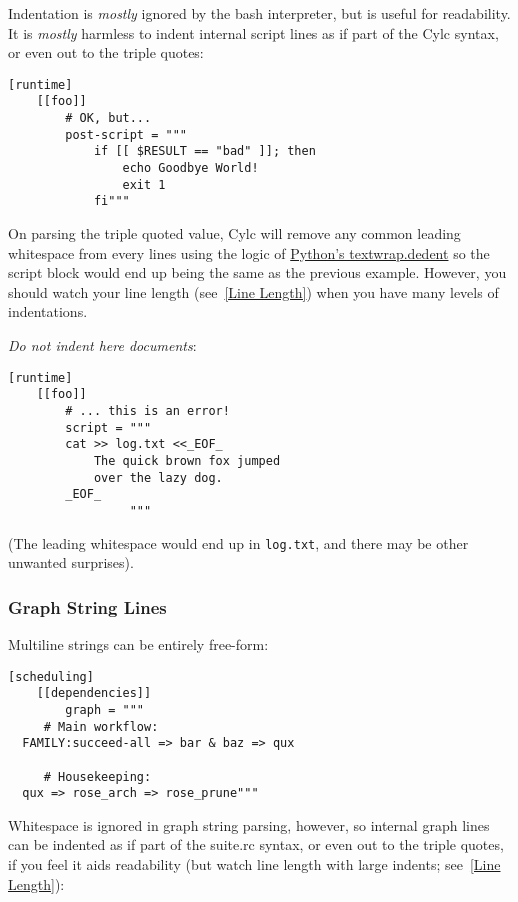 Indentation is {\em mostly} ignored by the bash interpreter, but is useful for
readability. It is {\em mostly} harmless to indent internal script lines as if
part of the Cylc syntax, or even out to the triple quotes:

\lstset{language=suiterc}
\begin{lstlisting}
[runtime]
    [[foo]]
        # OK, but...
        post-script = """
            if [[ $RESULT == "bad" ]]; then
                echo Goodbye World!
                exit 1
            fi"""
\end{lstlisting}

On parsing the triple quoted value, Cylc will remove any common leading
whitespace from every lines using the logic of
\href{https://docs.python.org/2/library/textwrap.html#textwrap.dedent}{Python's textwrap.dedent}
so the script block would end up being the same as the previous example.
However, you should watch your line length (see~\ref{Line Length}) when you
have many levels of indentations.

{\em Do not indent here documents}:

\lstset{language=suiterc}
\begin{lstlisting}
[runtime]
    [[foo]]
        # ... this is an error!
        script = """
        cat >> log.txt <<_EOF_
            The quick brown fox jumped
            over the lazy dog.
        _EOF_
                 """
\end{lstlisting}

(The leading whitespace would end up in \lstinline=log.txt=,
and there may be other unwanted surprises).

\subsubsection{Graph String Lines}

Multiline \lstinline@graph@ strings can be entirely free-form:

\lstset{language=suiterc}
\begin{lstlisting}
[scheduling]
    [[dependencies]]
        graph = """
     # Main workflow:
  FAMILY:succeed-all => bar & baz => qux

     # Housekeeping:
  qux => rose_arch => rose_prune"""
\end{lstlisting}

Whitespace is ignored in graph string parsing, however, so internal graph lines
can be indented as if part of the suite.rc syntax, or even out to the triple
quotes, if you feel it aids readability (but watch line length with large
indents; see~\ref{Line Length}):

